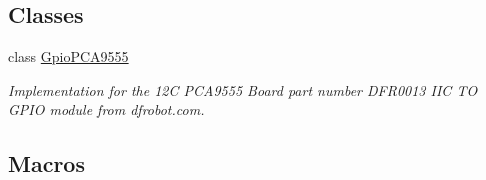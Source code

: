 \subsection*{Classes}
\begin{DoxyCompactItemize}
\item 
class \hyperlink{classGpioPCA9555}{Gpio\+P\+C\+A9555}
\begin{DoxyCompactList}\small\item\em Implementation for the 12C P\+C\+A9555 Board part number D\+F\+R0013 I\+IC TO G\+P\+IO module from dfrobot.\+com. \end{DoxyCompactList}\end{DoxyCompactItemize}
\subsection*{Macros}
